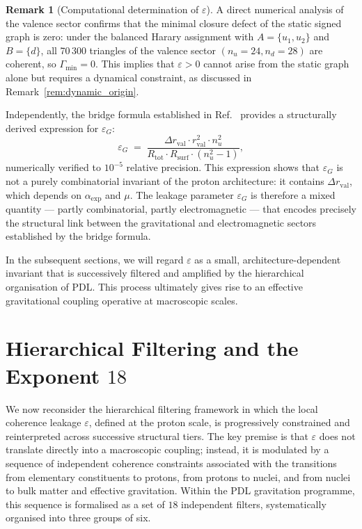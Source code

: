 \documentclass[11pt,a4paper]{article}
\theoremstyle{definition}
\newtheorem{remark}[theorem]{Remark}
\begin{document}
\begin{remark}[Computational determination of $\varepsilon$]
\label{rem:computational_eps}
A direct numerical analysis of the valence sector confirms that the minimal closure defect of the static signed graph is zero: under the balanced Harary assignment with $A = \{u_1, u_2\}$ and $B = \{d\}$, all 70\,300 triangles of the valence sector $(n_u=24, n_d=28)$ are coherent, so $\Gamma_{\min} = 0$. This implies that $\varepsilon > 0$ cannot arise from the static graph alone but requires a dynamical constraint, as discussed in Remark~\ref{rem:dynamic_origin}.

Independently, the bridge formula established in Ref.~\cite{Universal_Coherence_Leakage_2026} provides a structurally derived expression for $\varepsilon_G$:
\begin{equation}
    \varepsilon_G 
    \;=\; \frac{\Delta r_{\mathrm{val}} \cdot r_{\mathrm{val}}^2 \cdot n_u^2}
               {R_{\mathrm{tot}} \cdot R_{\mathrm{surf}} \cdot (n_u^2-1)},
    \label{eq:eps_G_bridge}
\end{equation}
numerically verified to $10^{-5}$ relative precision. This expression shows that $\varepsilon_G$ is not a purely combinatorial invariant of the proton architecture: it contains $\Delta r_{\mathrm{val}}$, which depends on $\alpha_{\exp}$ and $\mu$. The leakage parameter $\varepsilon_G$ is therefore a mixed quantity — partly combinatorial, partly electromagnetic — that encodes precisely the structural link between the gravitational and electromagnetic sectors established by the bridge formula.
\end{remark}

In the subsequent sections, we will regard $\varepsilon$ as a small, architecture-dependent invariant that is successively filtered and amplified by the hierarchical organisation of PDL. This process ultimately gives rise to an effective gravitational coupling operative at macroscopic scales.\cite{Exponent_18_PDL_2026,Effective_Fields_PDL_2026}

\section{Hierarchical Filtering and the Exponent \texorpdfstring{$18$}{18}}
\label{sec:hierarchical_filters}

We now reconsider the hierarchical filtering framework in which the local coherence leakage $\varepsilon$, defined at the proton scale, is progressively constrained and reinterpreted across successive structural tiers. The key premise is that $\varepsilon$ does not translate directly into a macroscopic coupling; instead, it is modulated by a sequence of independent coherence constraints associated with the transitions from elementary constituents to protons, from protons to nuclei, and from nuclei to bulk matter and effective gravitation.\cite{Exponent_18_PDL_2026,PDL_Global_Mapping_2026} Within the PDL gravitation programme, this sequence is formalised as a set of $18$ independent filters, systematically organised into three groups of six.
\end{document}
